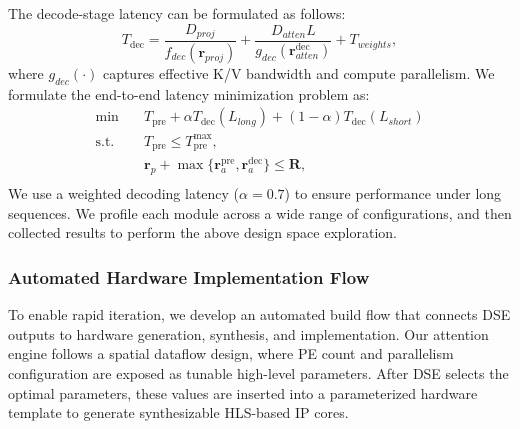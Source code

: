 \documentclass[9pt,sigconf]{acmart}
\begin{document}
The decode-stage latency can be formulated as follows:
\begin{equation}
T_{\text{dec}} 
= \frac{D_{proj}}{f_{dec}(\mathbf{r}_{proj})}
+ \frac{D_{atten} L}{g_{dec}(\mathbf{r}_{atten}^{\text{dec}})} 
+ T_{weights},
\label{eq:decode_latency}
\end{equation}
where $g_{dec}(\cdot)$ captures effective K/V bandwidth and compute parallelism.
We formulate the end-to-end latency minimization problem as:
\begin{equation}
\begin{aligned}
\min
\quad & T_{\text{pre}} + \alpha T_{\text{dec}}(L_{long}) + (1-\alpha) T_{\text{dec}}(L_{short})\\
\text{s.t.} \quad &
T_{\text{pre}} \le T_{\text{pre}}^{\max}, \\
& \mathbf{r}_p + \max\{\mathbf{r}_{a}^{\text{pre}}, \mathbf{r}_{a}^{\text{dec}}\} \le \mathbf{R}, \\
\end{aligned}
\label{eq:optimization}
\end{equation}
We use a weighted decoding latency ($\alpha = 0.7$) to ensure performance under long sequences. We profile each module across a wide range of configurations, and then collected results to perform the above design space exploration.















\subsubsection{Automated Hardware Implementation Flow}
To enable rapid iteration, we develop an automated build flow that connects DSE outputs to hardware generation, synthesis, and implementation. Our attention engine follows a spatial dataflow design, where PE count and parallelism configuration are exposed as tunable high-level parameters. After DSE selects the optimal parameters, these values are inserted into a parameterized hardware template to generate synthesizable HLS-based IP cores.
\end{document}
